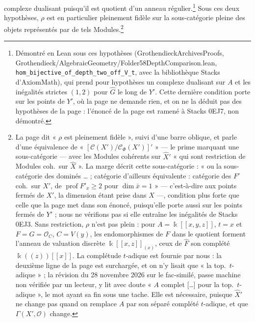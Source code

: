 \documentclass[11pt,a4paper]{article}
\begin{document}
complexe dualisant puisqu'il est quotient d'un anneau
régulier.\footnote{Démontré en Lean sous ces hypothèses
(GrothendieckArchivesProofs, Grothendieck/AlgebraicGeometry/Folder58DepthComparison.lean,
\texttt{hom\_bijective\_of\_depth\_two\_off\_V\_t}, avec la bibliothèque Stacks d'AxiomMath), qui
prend pour hypothèses un complexe dualisant sur $A$ et les inégalités strictes
$(1, 2)$ pour $\widehat{G}$ le long de $Y'$. Cette dernière condition porte sur
les points de $Y'$, où la page ne demande rien, et on ne la déduit pas des
hypothèses de la page : l'énoncé de la page est ramené à Stacks 0EJ7, non
démontré.} Sous ces deux hypothèses, $\rho$ est en particulier pleinement
fidèle sur la sous-catégorie pleine des objets représentés par de tels
Modules.\footnote{La page dit « $\rho$ est
pleinement fidèle », suivi d'une barre oblique, et parle d'une équivalence de
« $[\mathcal{C}(X')/\mathcal{C}_\Phi(X')]'$ » --- le prime marquant une
sous-catégorie --- avec les Modules cohérents sur $\widehat{X}'$ « qui sont
restriction de Modules coh.\ sur $\widehat{X}$ ». La marge décrit cette
sous-catégorie : « ou la sous-catégorie des dominés … ; catégorie d'ailleurs
équivalente : catégorie des $F'$ coh.\ sur $X'$, de
$\operatorname{prof} F'_x \geq 2$ pour $\dim \bar{x} = 1$ » --- c'est-à-dire
aux points fermés de $X'$, la dimension étant prise dans $X$ ---, condition
plus forte que celle que la page met dans son énoncé, puisqu'elle porte aussi
sur les points fermés de $Y'$ ; nous ne vérifions pas si elle entraîne les
inégalités de Stacks 0EJ3. Sans restriction, $\rho$
n'est pas plein : pour $A = \Bbbk[[x, y, z]]$, $t = x$ et $F = G =
\mathcal{O}_C$, $C = V(y)$, les endomorphismes de $F$ dans le quotient forment
l'anneau de valuation discrète $\Bbbk[[x, z]]_{(x)}$, ceux de $\widehat{F}$ son
complété $\Bbbk((z))[[x]]$. La complétude $t$-adique est fournie par nous : la
deuxième ligne de la page est surchargée, et on n'y lisait que « la top.\
$t$-adique » ; la révision du 28 novembre 2026 sur le fac-similé, passe machine
non vérifiée par un lecteur, y lit avec doute « $A$ complet […] pour la top.\
$t$-adique », le mot ayant sa fin sous une tache. Elle est nécessaire, puisque $\widehat{X}'$ ne change pas quand
on remplace $A$ par son séparé complété $t$-adique, et que
$\Gamma(X', \mathcal{O})$ change.}
\end{document}
